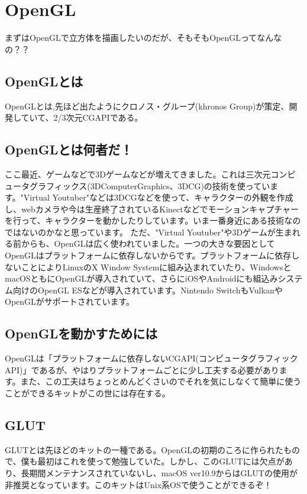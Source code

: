 \documentclass[a4paper,titlepage]{jsarticle}
\begin{document}
\newpage

\section{OpenGL}
まずはOpenGLで立方体を描画したいのだが、そもそもOpenGLってなんなの？？

\subsection{OpenGLとは}
OpenGLとは,先ほど出たようにクロノス・グループ(khronos Group)が策定、開発していて、2/3次元CGAPIである。

\subsection{OpenGLとは何者だ！}
ここ最近、ゲームなどで3Dゲームなどが増えてきました。これは三次元コンピュータグラフィックス(3DComputerGraphics、3DCG)の技術を使っています。"Virtual Youtuber"などは3DCGなどを使って、キャラクターの外観を作成し、webカメラや今は生産終了されているKinectなどでモーションキャプチャーを行って、キャラクターを動かしたりしています。いま一番身近にある技術なのではないのかなと思っています。
ただ、"Virtual Youtuber"や3Dゲームが生まれる前からも、OpenGLは広く使われていました。一つの大きな要因としてOpenGLはプラットフォームに依存しないからです。プラットフォームに依存しないことによりLinuxのX Window Systemに組み込まれていたり、WindowsとmacOSともにOpenGLが導入されていて、さらにiOSやAndroidにも組込みシステム向けのOpenGL ESなどが導入されています。Nintendo SwitchもVulkanやOpenGLがサポートされています。

\subsection{OpenGLを動かすためには}
OpenGLは「プラットフォームに依存しないCGAPI(コンピュータグラフィックAPI)」であるが、やはりプラットフォームごとに少し工夫する必要があります。また、この工夫はちょっとめんどくさいのでそれを気にしなくて簡単に使うことができるキットがこの世には存在する。

\subsection{GLUT}
GLUTとは先ほどのキットの一種である。OpenGLの初期のころに作られたもので、僕も最初はこれを使って勉強していた。しかし、このGLUTには欠点があり、長期間メンテナンスされていないし、macOS ver10.9からはGLUTの使用が非推奨となっています。このキットはUnix系OSで使うことができるぞ！
\end{document}
